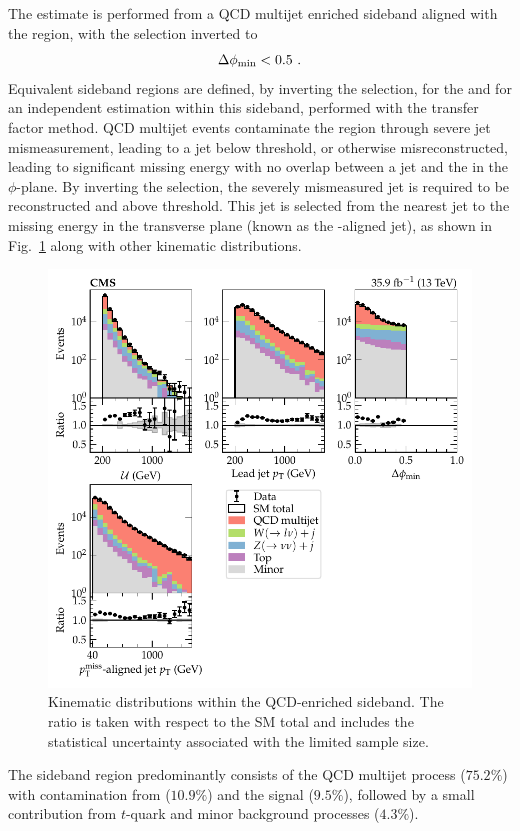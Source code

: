 The estimate is performed from a QCD multijet enriched sideband aligned with the \metplusjets region, with the \mindphi selection inverted to
%
\begin{equation}
    \Delta\phi_{\mathrm{min}} < 0.5\ .
\end{equation}
%
Equivalent sideband regions are defined, by inverting the \mindphi selection, for the \muplusjets and \eleplusjets for an independent \IWj estimation within this sideband, performed with the transfer factor method. QCD multijet events contaminate the \metplusjets region through severe jet mismeasurement, leading to a jet below threshold, or otherwise misreconstructed, leading to significant missing energy with no overlap between a jet and the \ptmiss in the $\phi$-plane. By inverting the \mindphi selection, the severely mismeasured jet is required to be reconstructed and above threshold. This jet is selected from the nearest jet to the missing energy in the transverse plane (known as the \ptmiss-aligned jet), as shown in Fig.~\ref{fig:monojetqcd-nearest-jet-pt} along with other kinematic distributions.
%
\begin{figure}
    \centering
    \includegraphics{chapters/042_backgrounds/images/monojetqcd_dists.pdf}
    \caption[QCD-enriched sideband kinematics.]{
        Kinematic distributions within the QCD-enriched sideband. The ratio is taken with respect to the SM total and includes the statistical uncertainty associated with the limited sample size.
    }
    \label{fig:monojetqcd-nearest-jet-pt}
\end{figure}
%
The sideband region predominantly consists of the QCD multijet process ($75.2\%$) with contamination from \IWlvj ($10.9\%$) and the signal \IZvvj ($9.5\%$), followed by a small contribution from $t$-quark and minor background processes ($4.3\%$).

